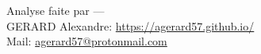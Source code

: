 \newpage


\begin{flushright}
Analyse faite par ---\\
GERARD Alexandre: \href{https://agerard57.github.io/}{https://agerard57.github.io/}\\
Mail: \href{mailto:agerard57@protonmail.com}{agerard57@protonmail.com}
\end{flushright}

